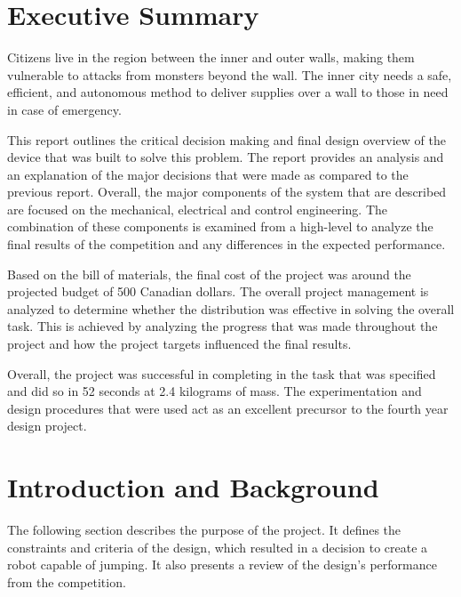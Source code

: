 \documentclass[ece]{uw-wkrpt}
\let\oldsection\section
\renewcommand\section{\clearpage\oldsection}
\begin{document}
\section{Executive Summary}\label{sec:summary}
\onehalfspacing
Citizens live in the region between the inner and outer walls, making them vulnerable to attacks from monsters beyond the wall. The inner city needs a safe, efficient, and autonomous method to deliver supplies over a wall to those in need in case of emergency.

This report outlines the critical decision making and final design overview of the device that was built to solve this problem. The report provides an analysis and an explanation of the major decisions that were made as compared to the previous report. Overall, the major components of the system that are described are focused on the mechanical, electrical and control engineering. The combination of these components is examined from a high-level to analyze the final results of the competition and any differences in the expected performance. 

Based on the bill of materials, the final cost of the project was around the projected budget of 500 Canadian dollars. The overall project management is analyzed to determine whether the distribution was effective in solving the overall task. This is achieved by analyzing the progress that was made throughout the project and how the project targets influenced the final results.  

Overall, the project was successful in completing in the task that was specified and did so in 52 seconds at 2.4 kilograms of mass. The experimentation and design procedures that were used act as an excellent precursor to the fourth year design project.

\tableofcontents
\listoffigures
\listoftables



\mainmatter

% 
\section{Introduction and Background}

The following section describes the purpose of the project. It defines the constraints and criteria of the design, which resulted in a decision to create a robot capable of jumping. It also presents a review of the design’s performance from the competition. 
\end{document}
